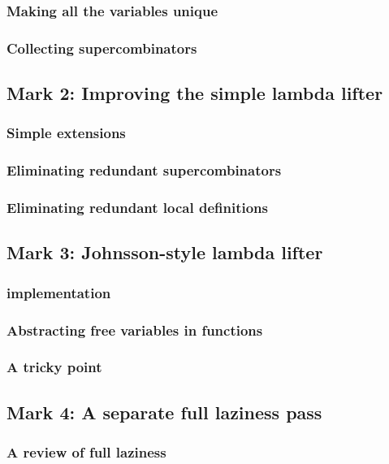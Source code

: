 \documentclass{jarticle}
\begin{document}
\subsubsection{Making all the variables unique}
\subsubsection{Collecting supercombinators}
\newpage

\subsection{Mark 2: Improving the simple lambda lifter}
\subsubsection{Simple extensions}
\subsubsection{Eliminating redundant supercombinators}
\subsubsection{Eliminating redundant local definitions}
\newpage

\subsection{Mark 3: Johnsson-style lambda lifter}
\subsubsection{implementation}
\subsubsection{Abstracting free variables in functions}
\subsubsection{A tricky point \dag}
\newpage

\subsection{Mark 4: A separate full laziness pass}
\subsubsection{A review of full laziness}
\end{document}
